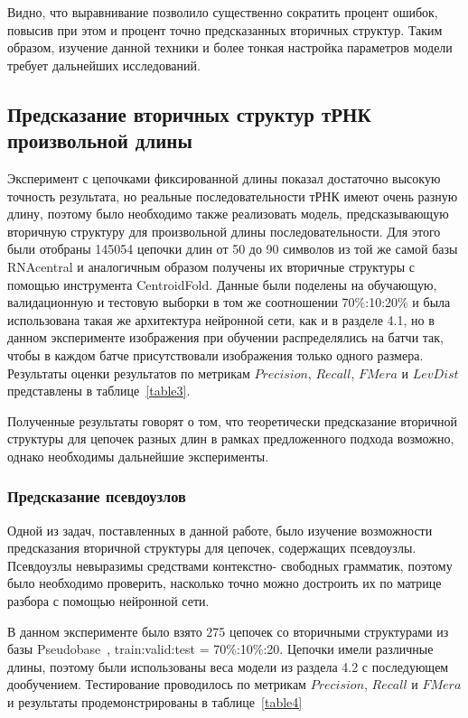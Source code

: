\documentclass[14pt]{matmex-diploma-custom}
\begin{document}


Видно, что выравнивание позволило существенно сократить процент ошибок, повысив при этом и процент точно предсказанных вторичных структур. Таким образом, изучение данной техники и более тонкая настройка параметров модели требует дальнейших исследований.

\subsection{Предсказание вторичных структур тРНК произвольной длины}
Эксперимент с цепочками фиксированной длины показал достаточно высокую точность результата, но реальные последовательности тРНК имеют очень разную длину, поэтому было необходимо также реализовать модель, предсказывающую вторичную структуру для произвольной длины последовательности. Для этого были отобраны 145054 цепочки длин от 50 до 90 символов из той же самой базы RNAcentral и аналогичным образом получены их вторичные структуры с помощью инструмента CentroidFold. Данные были поделены на обучающую, валидационную и тестовую выборки в том же соотношении 70\%:10\5:20\% и была использована такая же архитектура нейронной сети, как и в разделе 4.1, но в данном эксперименте изображения при обучении распределялись на батчи так, чтобы в каждом батче присутствовали изображения только одного размера.
Результаты оценки результатов по метрикам $Precision$, $Recall$, $FMera$ и $LevDist$ представлены в таблице~\ref{table3}.



Полученные результаты говорят о том, что теоретически предсказание вторичной структуры для цепочек разных длин в рамках предложенного подхода возможно, однако необходимы дальнейшие эксперименты.

\subsubsection{Предсказание псевдоузлов}
Одной из задач, поставленных в данной работе, было изучение возможности предсказания вторичной структуры для цепочек, содержащих псевдоузлы. Псевдоузлы невыразимы средствами контекстно- \linebreak свободных грамматик, поэтому было необходимо проверить, насколько точно можно достроить их по матрице разбора с помощью нейронной сети.

В данном эксперименте было взято 275 цепочек со вторичными структурами из базы Pseudobase~\cite{pseudobase}, train:valid:test = 70\%:10\%:20. Цепочки имели различные длины, поэтому были использованы веса модели из раздела 4.2 с последующем дообучением. Тестирование проводилось по метрикам $Precision$, $Recall$ и $FMera$ и результаты продемонстрированы в таблице~\ref{table4}
\end{document}
